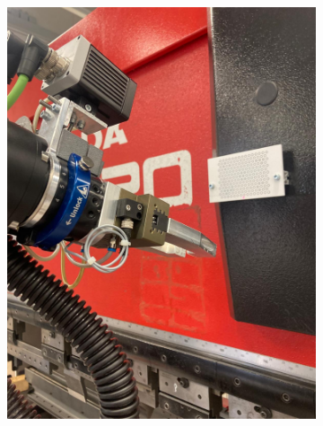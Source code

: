 \begin{figure}[h]
    \centering
    \begin{subfigure}{0.48\textwidth}
        \centering
        \includegraphics[width=\textwidth, angle=0]{figures/001calibration/calibration-process-left.jpeg} %
        \label{fig:calibration-process-left}
    \end{subfigure}\hspace{0cm}
    \begin{subfigure}{0.48\textwidth}
        \centering

\end{subfigure}
\end{figure}
